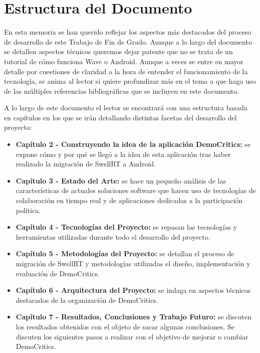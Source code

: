 \section{Estructura del Documento}

En esta memoria se han querido reflejar los aspectos más destacados del proceso de desarrollo de este Trabajo de Fin de Grado. Aunque a lo largo del documento se detallen aspectos técnicos queremos dejar patente que no se trata de un tutorial de cómo funciona Wave o Android. Aunque a veces se entre en mayor detalle por cuestiones de claridad a la hora de entender el funcionamiento de la tecnología, se anima al lector si quiere profundizar más en el tema a que haga uso de las múltiples referencias bibliográficas que se incluyen en este documento.  

A lo largo de este documento el lector se encontrará con una estructura basada en capítulos en los que se irán detallando distintas facetas del desarrollo del proyecto: 

\begin{itemize}
  \item \textbf{Capítulo 2 - Construyendo la idea de la aplicación DemoCritics:} se expone cómo y por qué se llegó a la idea de esta aplicación tras haber realizado la migración de SwellRT a Android.
  \item \textbf{Capítulo 3 - Estado del Arte:} se hace un pequeño análisis de las características de actuales soluciones software que hacen uso de tecnologías de colaboración en tiempo real y de aplicaciones dedicadas a la participación política.
  \item \textbf{Capítulo 4 - Tecnologías del Proyecto:} se repasan las tecnologías y herramientas utilizadas durante todo el desarrollo del proyecto.
  \item \textbf{Capítulo 5 - Metodologías del Proyecto:} se detallan el proceso de migración de SwellRT y metodologías utilizadas el diseño, implementación y evaluación de DemoCritics.
  \item \textbf{Capítulo 6 - Arquitectura del Proyecto:} se indaga en aspectos técnicos destacados de la organización de DemoCritics.
  \item \textbf{Capítulo 7 - Resultados, Conclusiones y Trabajo Futuro:} se discuten los resultados obtenidos con el objeto de sacar algunas conclusiones. Se discuten los siguientes pasos a realizar con el objetivo  de mejorar o cambiar DemoCritics.
\end{itemize}
